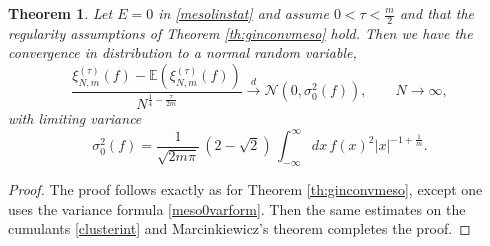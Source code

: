 \documentclass[11pt,reqno]{amsproc}
\newtheorem{theorem}{Theorem}
\numberwithin{equation}{section}
\numberwithin{theorem}{section}
\begin{document}
\begin{theorem}
\label{th:mesozero}
Let $E=0$ in \eqref{mesolinstat} and assume $0 < \tau < \frac{m}{2}$ and that the regularity assumptions of Theorem \ref{th:ginconvmeso} hold. Then we have the convergence in distribution to a normal random variable,
\begin{equation}
\frac{\xi^{(\tau)}_{N,m}(f)-\mathbb{E}(\xi^{(\tau)}_{N,m}(f))}{N^{\frac{1}{4}-\frac{\tau}{2m}}} \overset{d}{\longrightarrow} \mathcal{N}(0,\sigma_{0}^{2}(f)), \qquad N \to \infty, \label{normalconvmesoorigin}
\end{equation}
with limiting variance
\begin{equation}
\sigma_{0}^{2}(f) = \frac{1}{\sqrt{2m\pi}}\,(2-\sqrt{2})\,\int_{-\infty}^{\infty}dx\,f(x)^{2}|x|^{-1+\frac{1}{m}}.
\end{equation}
\end{theorem}
\begin{proof}
The proof follows exactly as for Theorem \ref{th:ginconvmeso}, except one uses the variance formula  \eqref{meso0varform}. Then the same estimates on the cumulants \eqref{clusterint} and Marcinkiewicz's theorem completes the proof.
\end{proof}
\end{document}
